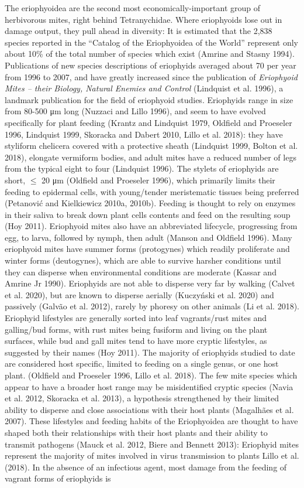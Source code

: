 \documentclass[12pt,final,CPage]{ufthesis}
\begin{document}
{  The eriophyoidea are the second most economically-important group of herbivorous mites, right behind Tetranychidae. Where eriophyoids lose out in damage output, they pull ahead in diversity: It is estimated that the 2,838 species reported in the ``Catalog of the Eriophyoidea of the World'' represent only about 10\% of the total number of species which exist (Amrine and Stasny 1994). Publications of new species descriptions of eriophyids averaged about 70 per year from 1996 to 2007, and have greatly increased since the publication of \emph{Eriophyoid Mites -- their Biology, Natural Enemies and Control} (Lindquist et al. 1996), a landmark publication for the field of eriophyoid studies. Eriophyids range in size from 80-500 \si{\micro\metre} long (Nuzzaci and Lillo 1996), and seem to have evolved specifically for plant feeding (Krantz and Lindquist 1979, Oldfield and Proeseler 1996, Lindquist 1999, Skoracka and Dabert 2010, Lillo et al. 2018): they have styliform chelicera covered with a protective sheath (Lindquist 1999, Bolton et al. 2018), elongate vermiform bodies, and adult mites have a reduced number of legs from the typical eight to four (Lindquist 1996). The stylets of eriophyids are short, \(\le\) 20 \si{\micro\metre} (Oldfield and Proeseler 1996), which primarily limits their feeding to epidermal cells, with young/tender meristematic tissues being preferred (Petanović and Kielkiewicz 2010a, 2010b). Feeding is thought to rely on enzymes in their saliva to break down plant cells contents and feed on the resulting soup (Hoy 2011). Eriophyoid mites also have an abbreviated lifecycle, progressing from egg, to larva, followed by nymph, then adult (Manson and Oldfield 1996). Many eriophyoid mites have summer forms (protogynes) which readily proliferate and winter forms (deutogynes), which are able to survive harsher conditions until they can disperse when environmental conditions are moderate (Kassar and Amrine Jr 1990). Eriophyids are not able to disperse very far by walking (Calvet et al. 2020), but are known to disperse aerially (Kuczyński et al. 2020) and passively (Galvão et al. 2012), rarely by phoresy on other animals (Li et al. 2018). Eriophyid lifestyles are generally sorted into leaf vagrants/rust mites and galling/bud forms, with rust mites being fusiform and living on the plant surfaces, while bud and gall mites tend to have more cryptic lifestyles, as suggested by their names (Hoy 2011). The majority of eriophyids studied to date are considered host specific, limited to feeding on a single genus, or one host plant. (Oldfield and Proeseler 1996, Lillo et al. 2018). The few mite species which appear to have a broader host range may be misidentified cryptic species (Navia et al. 2012, Skoracka et al. 2013), a hypothesis strengthened by their limited ability to disperse and close associations with their host plants (Magalhães et al. 2007). These lifestyles and feeding habits of the Eriophyoidea are thought to have shaped both their relationships with their host plants and their ability to transmit pathogens (Mauck et al. 2012, Biere and Bennett 2013): Eriophyid mites represent the majority of mites involved in virus transmission to plants Lillo et al. (2018). In the absence of an infectious agent, most damage from the feeding of vagrant forms of eriophyids is }
\end{document}
